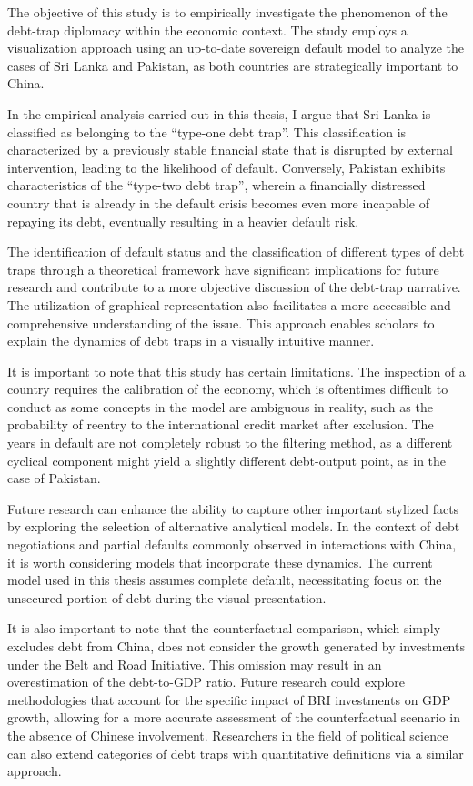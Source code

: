 The objective of this study is to empirically investigate the phenomenon of the debt-trap diplomacy within the economic context. The study employs a visualization approach using an up-to-date sovereign default model to analyze the cases of Sri Lanka and Pakistan, as both countries are strategically important to China.

In the empirical analysis carried out in this thesis, I argue that Sri Lanka is classified as belonging to the ``type-one debt trap''. This classification is characterized by a previously stable financial state that is disrupted by external intervention, leading to the likelihood of default. Conversely, Pakistan exhibits characteristics of the ``type-two debt trap'', wherein a financially distressed country that is already in the default crisis becomes even more incapable of repaying its debt, eventually resulting in a heavier default risk.

The identification of default status and the classification of different types of debt traps through a theoretical framework have significant implications for future research and contribute to a more objective discussion of the debt-trap narrative. The utilization of graphical representation also facilitates a more accessible and comprehensive understanding of the issue. This approach enables scholars to explain the dynamics of debt traps in a visually intuitive manner.

It is important to note that this study has certain limitations. The inspection of a country requires the calibration of the economy, which is oftentimes difficult to conduct as some concepts in the model are ambiguous in reality, such as the probability of reentry to the international credit market after exclusion. The years in default are not completely robust to the filtering method, as a different cyclical component might yield a slightly different debt-output point, as in the case of Pakistan.

Future research can enhance the ability to capture other important stylized facts by exploring the selection of alternative analytical models. In the context of debt negotiations and partial defaults commonly observed in interactions with China, it is worth considering models that incorporate these dynamics. The current model used in this thesis assumes complete default, necessitating focus on the unsecured portion of debt during the visual presentation.

It is also important to note that the counterfactual comparison, which simply excludes debt from China, does not consider the growth generated by investments under the Belt and Road Initiative. This omission may result in an overestimation of the debt-to-GDP ratio. Future research could explore methodologies that account for the specific impact of BRI investments on GDP growth, allowing for a more accurate assessment of the counterfactual scenario in the absence of Chinese involvement. Researchers in the field of political science can also extend categories of debt traps with quantitative definitions via a similar approach.